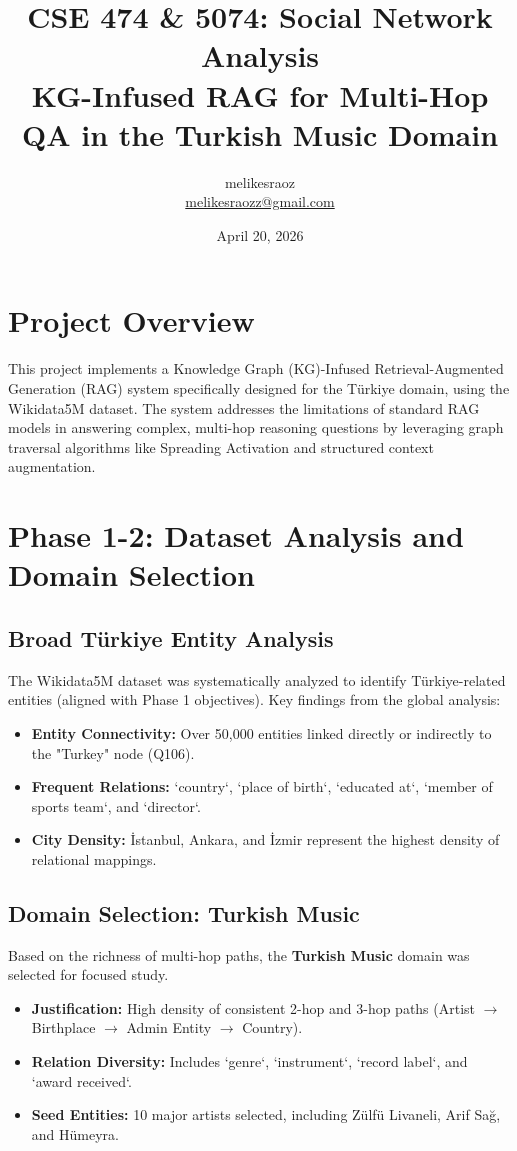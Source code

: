 \documentclass{report}
\title{CSE 474 \& 5074: Social Network Analysis \\ \textbf{KG-Infused RAG for Multi-Hop QA in the Turkish Music Domain}}
\author{melikesraoz \\ \href{mailto:melikesraozz@gmail.com}{melikesraozz@gmail.com}}
\date{April 20, 2026}
\begin{document}
\maketitle

\tableofcontents

\newpage

\chapter{Project Overview}
This project implements a Knowledge Graph (KG)-Infused Retrieval-Augmented Generation (RAG) system specifically designed for the Türkiye domain, using the Wikidata5M dataset. The system addresses the limitations of standard RAG models in answering complex, multi-hop reasoning questions by leveraging graph traversal algorithms like Spreading Activation and structured context augmentation.

\chapter{Phase 1-2: Dataset Analysis and Domain Selection}
\section{Broad Türkiye Entity Analysis}
The Wikidata5M dataset was systematically analyzed to identify Türkiye-related entities (aligned with Phase 1 objectives). 
Key findings from the global analysis:
\begin{itemize}
    \item \textbf{Entity Connectivity:} Over 50,000 entities linked directly or indirectly to the "Turkey" node (Q106).
    \item \textbf{Frequent Relations:} `country`, `place of birth`, `educated at`, `member of sports team`, and `director`.
    \item \textbf{City Density:} İstanbul, Ankara, and İzmir represent the highest density of relational mappings.
\end{itemize}

\section{Domain Selection: Turkish Music}
Based on the richness of multi-hop paths, the \textbf{Turkish Music} domain was selected for focused study.
\begin{itemize}
    \item \textbf{Justification:} High density of consistent 2-hop and 3-hop paths (Artist $\to$ Birthplace $\to$ Admin Entity $\to$ Country).
    \item \textbf{Relation Diversity:} Includes `genre`, `instrument`, `record label`, and `award received`.
    \item \textbf{Seed Entities:} 10 major artists selected, including Zülfü Livaneli, Arif Sağ, and Hümeyra.
\end{itemize}
\end{document}
